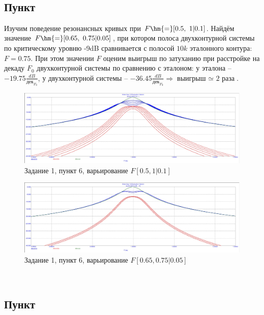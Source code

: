 \documentclass[a4paper, 14pt]{extarticle}%
\begin{document}
~

\subsection{Пункт}

Изучим поведение резонансных кривых при $F \hm{=} [0.5,~1|0.1]$. Найдём значение $F \hm{=} [0.65,~0.75|0.05]$, при котором полоса двухконтурной системы по критическому уровню -9dB сравнивается с полосой $10k$ эталонного контура: $F = 0.75$. При этом значении $F$ оценим выигрыш по затуханию при расстройке на декаду $F_0$ двухконтурной системы по сравнению с эталоном: у эталона -- $-19.75\frac{dB}{\text{дек}_{F_0}}$, у двухконтурной системы -- $-36.45\frac{dB}{\text{дек}_{F_0}} \Longrightarrow \text{выигрыш $\simeq$ 2 раза}$.

\begin{figure}[h!]
	\centering
			\includegraphics[width=1.1\linewidth]{1.6varF1.jpg}
            \caption{Задание 1,  пункт 6, варьирование $F [0.5, 1|0.1]$}
	\label{A}
\end{figure}

\begin{figure}[h!]
	\centering
			\includegraphics[width=1.1\linewidth]{1.6varF2.jpg}
            \caption{Задание 1,  пункт 6, варьирование $F [0.65, 0.75|0.05]$}
	\label{A}
\end{figure}

~

\subsection{Пункт}
\end{document}
